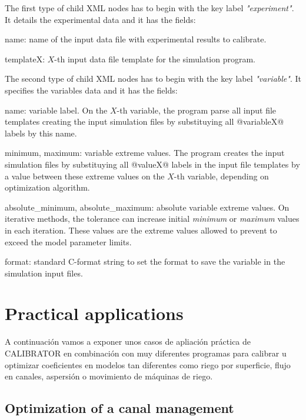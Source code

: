 \documentclass[review,authoryear]{elsarticle}
\begin{document}
The first type of child XML nodes has to begin with the key label
\emph{"experiment"}. It details the experimental data and it has the fields:
\begin{description}
\item{name}: name of the input data file with experimental results to calibrate.
\item{templateX}: $X$-th input data file template for the simulation program.
\end{description}

The second type of child XML nodes has to begin with the key label
\emph{"variable"}. It specifies the variables data and it has the fields:
\begin{description}
\item{name}: variable label. On the $X$-th variable, the program parse all input
file templates creating the input simulation files by substituying all
@variableX@ labels by this name.
\item{minimum, maximum}: variable extreme values. The program creates the input
simulation files by substituying all @valueX@ labels in the input file templates
by a value between these extreme values on the $X$-th variable, depending on
optimization algorithm.
\item{absolute\_minimum, absolute\_maximum}: absolute variable extreme values.
On iterative methods, the tolerance can increase initial \emph{minimum} or
\emph{maximum} values in each iteration. These values are the extreme values
allowed to prevent to exceed the model parameter limits.
\item{format}: standard C-format string to set the format to save the variable
in the simulation input files.
\end{description}

\section{Practical applications}

A continuación vamos a exponer unos casos de apliación práctica de CALIBRATOR en
combinación con muy diferentes programas para calibrar u optimizar coeficientes
en modelos tan diferentes como riego por superficie, flujo en canales, aspersión
o movimiento de máquinas de riego.

\subsection{Optimization of a canal management}
\end{document}
